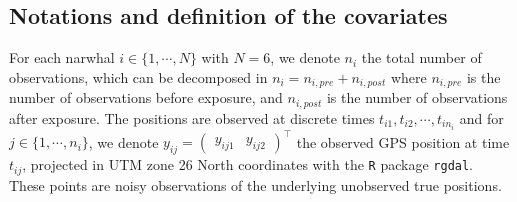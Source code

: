 \documentclass[11pt]{article}
\newcommand {\1}{\mathbb{1}}
\theoremstyle{definition}
\theoremstyle{remark}
\theoremstyle{remark}
\begin{document}
\subsection{Notations and definition of the covariates}
\label{subsection: covariates}

For each narwhal $i \in \{1,\cdots,N\}$ with $N=6$, we denote $n_i$ the total number of observations, which can be decomposed in $n_i=n_{i,pre}+n_{i,post}$ where $n_{i,pre}$ is the number of observations before exposure, and $n_{i,post}$ is the number of observations after exposure. The positions are observed at discrete times $t_{i1}, t_{i2}, \cdots,t_{in_i}$ and  for $j \in \{1,\cdots,n_i\}$, we denote $y_{ij}=\begin{pmatrix} y_{ij1} & y_{ij2} \end{pmatrix}^\top$ the observed GPS position at time $t_{ij}$, projected in UTM zone 26 North coordinates with the \texttt{R} package \texttt{rgdal}. These points are noisy observations of the underlying unobserved true positions.\\
\end{document}
